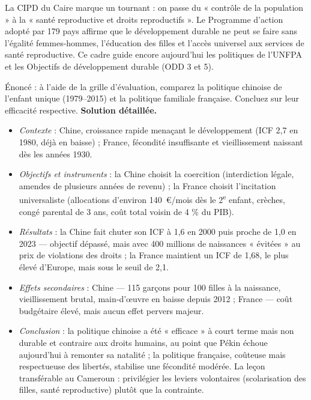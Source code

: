\documentclass[11pt]{article}
\begin{document}
\begin{savaistu}
La CIPD du Caire marque un tournant : on passe du « contrôle de la population » à la « santé reproductive et droits reproductifs ». Le Programme d'action adopté par 179 pays affirme que le développement durable ne peut se faire sans l'égalité femmes-hommes, l'éducation des filles et l'accès universel aux services de santé reproductive. Ce cadre guide encore aujourd'hui les politiques de l'UNFPA et les Objectifs de développement durable (ODD 3 et 5).
\end{savaistu}

\begin{exoresolu}
Énoncé : à l'aide de la grille d'évaluation, comparez la politique chinoise de l'enfant unique (1979--2015) et la politique familiale française. Concluez sur leur efficacité respective.
\tcblower
\textbf{Solution détaillée.}
\begin{itemize}
\item \emph{Contexte} : Chine, croissance rapide menaçant le développement (ICF 2,7 en 1980, déjà en baisse) ; France, fécondité insuffisante et vieillissement naissant dès les années 1930.
\item \emph{Objectifs et instruments} : la Chine choisit la coercition (interdiction légale, amendes de plusieurs années de revenu) ; la France choisit l'incitation universaliste (allocations d'environ \SI{140}{\euro}/mois dès le 2\textsuperscript{e} enfant, crèches, congé parental de 3 ans, coût total voisin de 4 \% du PIB).
\item \emph{Résultats} : la Chine fait chuter son ICF à 1,6 en 2000 puis proche de 1,0 en 2023 — objectif dépassé, mais avec 400 millions de naissances « évitées » au prix de violations des droits ; la France maintient un ICF de 1,68, le plus élevé d'Europe, mais sous le seuil de 2,1.
\item \emph{Effets secondaires} : Chine — 115 garçons pour 100 filles à la naissance, vieillissement brutal, main-d'œuvre en baisse depuis 2012 ; France — coût budgétaire élevé, mais aucun effet pervers majeur.
\item \emph{Conclusion} : la politique chinoise a été « efficace » à court terme mais non durable et contraire aux droits humains, au point que Pékin échoue aujourd'hui à remonter sa natalité ; la politique française, coûteuse mais respectueuse des libertés, stabilise une fécondité modérée. La leçon transférable au Cameroun : privilégier les leviers volontaires (scolarisation des filles, santé reproductive) plutôt que la contrainte.
\end{itemize}
\end{exoresolu}
\end{document}
